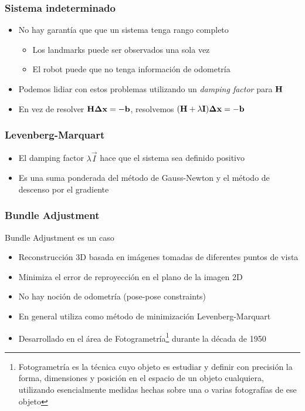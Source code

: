 \begin{frame}
    \frametitle{Sistema indeterminado}
    \begin{itemize}
		\item No hay garantía que que un sistema tenga rango completo
		\begin{itemize}
			\item Los landmarks puede ser observados una sola vez
			\item El robot puede que no tenga información de odometría
		\end{itemize}
		\item Podemos lidiar con estos problemas utilizando un \emph{damping factor} para $\boldsymbol{\mathbf{H}}$
		\item En vez de resolver $\boldsymbol{\mathbf{H}} \boldsymbol{\mathbf{\Delta}} \boldsymbol{\mathbf{x}} = - \boldsymbol{\mathbf{b}}$, resolvemos
		$(\boldsymbol{\mathbf{H}} + \lambda \boldsymbol{\mathbf{I}}) \boldsymbol{\mathbf{\Delta}} \boldsymbol{\mathbf{x}} = - \boldsymbol{\mathbf{b}}$
    \end{itemize}
\end{frame}

\begin{frame}
    \frametitle{Levenberg-Marquart}
    \begin{itemize}
		\item El damping factor $\lambda \vec{I}$ hace que el sistema sea definido positivo
		\item Es una suma ponderada del método de Gauss-Newton y el método de descenso por el gradiente
    \end{itemize}
\end{frame}


\begin{frame}
    \frametitle{Bundle Adjustment}
    
    Bundle Adjustment es un caso
    
    \begin{itemize}
        \item Reconstrucción 3D basada en imágenes tomadas de diferentes puntos de vista
        \item Minimiza el error de reproyección en el plano de la imagen 2D
        \item No hay noción de odometría (pose-pose constraints)
        \item En general utiliza como método de minimización Levenberg-Marquart
        \item Desarrollado en el área de Fotogrametría\footnote{Fotogrametría es la técnica cuyo objeto es estudiar y definir con precisión la forma, dimensiones y posición en el espacio de un objeto cualquiera, utilizando esencialmente medidas hechas sobre una o varias fotografías de ese objeto} durante la década de 1950
    \end{itemize}
    
\end{frame}


